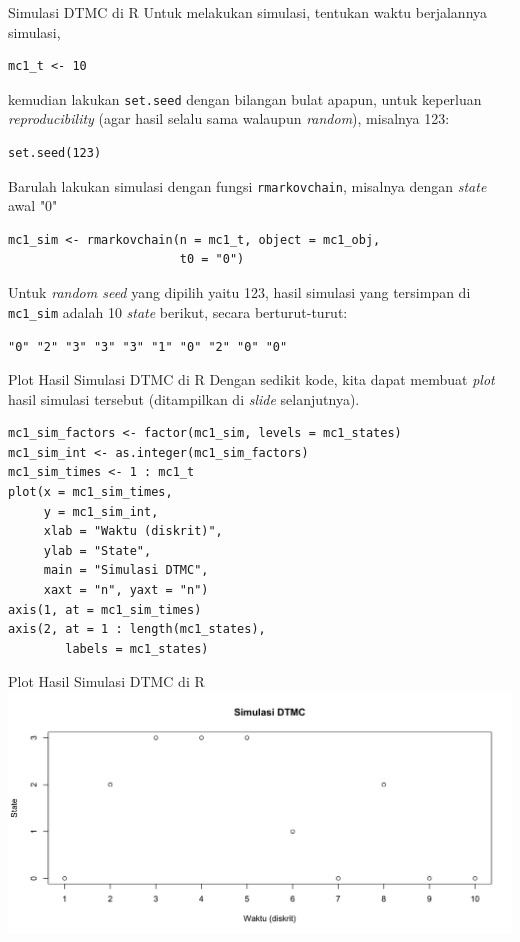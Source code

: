 \documentclass{beamer}
\begin{document}
\begin{frame}[fragile]{Simulasi DTMC di R}
    Untuk melakukan simulasi, tentukan waktu berjalannya simulasi,

\begin{verbatim}
mc1_t <- 10    
\end{verbatim}

    kemudian lakukan \verb|set.seed| dengan bilangan bulat apapun, untuk keperluan \textit{reproducibility} (agar hasil selalu sama walaupun \textit{random}), misalnya 123:

\begin{verbatim}
set.seed(123)
\end{verbatim}

    Barulah lakukan simulasi dengan fungsi \verb|rmarkovchain|, misalnya dengan \textit{state} awal "0"

\begin{verbatim}
mc1_sim <- rmarkovchain(n = mc1_t, object = mc1_obj,
                        t0 = "0")
\end{verbatim}

Untuk \textit{random seed} yang dipilih yaitu 123, hasil simulasi yang tersimpan di \verb|mc1_sim| adalah 10 \textit{state} berikut, secara berturut-turut:

\verb|"0" "2" "3" "3" "3" "1" "0" "2" "0" "0"|

\end{frame}

\begin{frame}[fragile]{Plot Hasil Simulasi DTMC di R}
    Dengan sedikit kode, kita dapat membuat \textit{plot} hasil simulasi tersebut (ditampilkan di \textit{slide} selanjutnya).

\begin{verbatim}
mc1_sim_factors <- factor(mc1_sim, levels = mc1_states)
mc1_sim_int <- as.integer(mc1_sim_factors)
mc1_sim_times <- 1 : mc1_t
plot(x = mc1_sim_times,
     y = mc1_sim_int,
     xlab = "Waktu (diskrit)",
     ylab = "State",
     main = "Simulasi DTMC",
     xaxt = "n", yaxt = "n")
axis(1, at = mc1_sim_times)
axis(2, at = 1 : length(mc1_states),
        labels = mc1_states)
\end{verbatim}
\end{frame}

\begin{frame}{Plot Hasil Simulasi DTMC di R}
    \includegraphics[scale=0.45]{gambar/contoh_dtmc_simulasi.png}
\end{frame}
\end{document}
